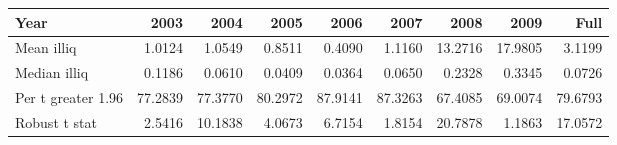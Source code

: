\begin{tabular}{l|rrrrrrrr}
\toprule
Year & 2003 & 2004 & 2005 & 2006 & 2007 & 2008 & 2009 & Full \\
\midrule
Mean illiq & 1.0124 & 1.0549 & 0.8511 & 0.4090 & 1.1160 & 13.2716 & 17.9805 & 3.1199 \\
Median illiq & 0.1186 & 0.0610 & 0.0409 & 0.0364 & 0.0650 & 0.2328 & 0.3345 & 0.0726 \\
Per t greater 1.96 & 77.2839 & 77.3770 & 80.2972 & 87.9141 & 87.3263 & 67.4085 & 69.0074 & 79.6793 \\
Robust t stat & 2.5416 & 10.1838 & 4.0673 & 6.7154 & 1.8154 & 20.7878 & 1.1863 & 17.0572 \\
\bottomrule
\end{tabular}

